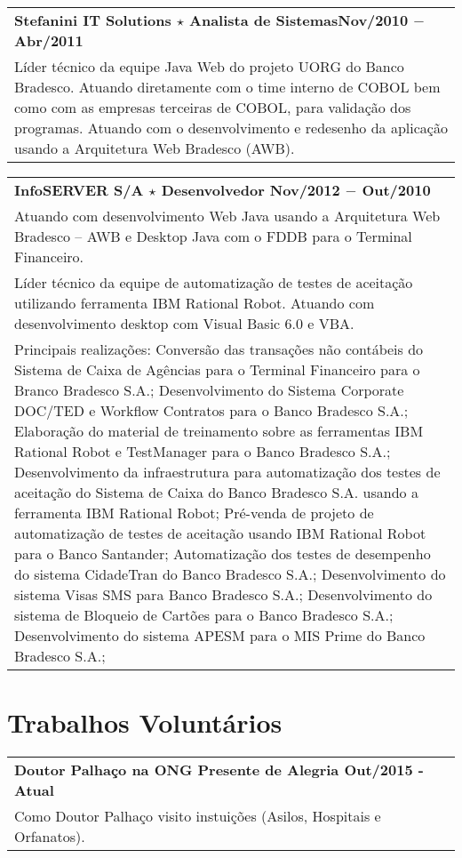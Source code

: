 \documentclass[a4paper, oneside, final]{scrartcl}
\newcommand{\vspc}{\vspace{0.15cm}} %
\begin{document}
\begin{center}
\begin{tabularx}{1\linewidth}{X}
{\bf Stefanini IT Solutions $\star$ Analista de Sistemas\hfill Nov/2010 $-$ Abr/2011} \\
Líder técnico da equipe Java Web do projeto UORG do Banco Bradesco. Atuando diretamente com o time
interno de COBOL bem como com as empresas terceiras de COBOL, para validação dos programas. Atuando
com o desenvolvimento e redesenho da aplicação usando a Arquitetura Web Bradesco (AWB).\vspc\\
\end{tabularx}

\begin{tabularx}{1\linewidth}{X}
{\bf InfoSERVER S/A $\star$ Desenvolvedor \hfill Nov/2012 $-$ Out/2010} \\
Atuando com desenvolvimento Web Java usando a Arquitetura Web Bradesco – AWB e Desktop Java com o
FDDB para o Terminal Financeiro. \vspc\\
Líder técnico da equipe de automatização de testes de aceitação utilizando ferramenta IBM Rational
Robot. Atuando com desenvolvimento desktop com Visual Basic 6.0 e VBA. \vspc\\
Principais realizações: Conversão das transações não contábeis do Sistema de Caixa de Agências para o
Terminal Financeiro para o Branco Bradesco S.A.; Desenvolvimento do Sistema Corporate DOC/TED e
Workflow Contratos para o Banco Bradesco S.A.; Elaboração do material de treinamento sobre as ferramentas
IBM Rational Robot e TestManager para o Banco Bradesco S.A.; Desenvolvimento da infraestrutura para
automatização dos testes de aceitação do Sistema de Caixa do Banco Bradesco S.A. usando a ferramenta IBM
Rational Robot; Pré-venda de projeto de automatização de testes de aceitação usando IBM Rational Robot para o Banco Santander; Automatização dos testes de desempenho do sistema CidadeTran do Banco Bradesco 
S.A.; Desenvolvimento do sistema Visas SMS para Banco Bradesco S.A.; Desenvolvimento do sistema de
Bloqueio de Cartões para o Banco Bradesco S.A.; Desenvolvimento do sistema APESM para o MIS Prime do
Banco Bradesco S.A.; 

\end{tabularx}

\section{Trabalhos Voluntários}
\begin{tabularx}{1\linewidth}{X}
{\bf Doutor Palhaço na ONG Presente de Alegria \hfill Out/2015 - Atual} \\
Como Doutor Palhaço visito instuições (Asilos, Hospitais e Orfanatos). \vspc\\
\end{tabularx}

\end{center}
\end{document}
